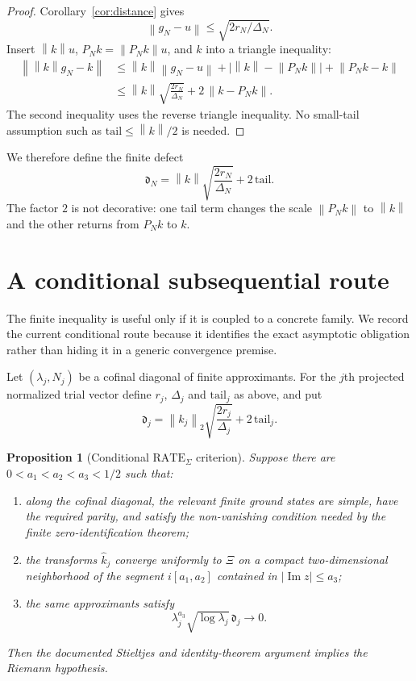 \documentclass[11pt]{article}
\newtheorem{proposition}[theorem]{Proposition}
\theoremstyle{definition}
\newcommand{\norm}[1]{\left\lVert #1\right\rVert}
\newcommand{\defect}{\mathfrak d}
\begin{document}
\begin{proof}
Corollary~\ref{cor:distance} gives
\[
 \norm{g_N-u}\leq\sqrt{2r_N/\Delta_N}.
\]
Insert $\norm{k}u$, $P_Nk=\norm{P_Nk}u$, and $k$ into a triangle inequality:
\begin{align*}
 \norm{\norm{k}g_N-k}
 &\leq \norm{k}\norm{g_N-u}
 +\bigl|\norm{k}-\norm{P_Nk}\bigr|
 +\norm{P_Nk-k}\\
 &\leq \norm{k}\sqrt{\frac{2r_N}{\Delta_N}}
 +2\,\norm{k-P_Nk}.
\end{align*}
The second inequality uses the reverse triangle inequality.  No small-tail
assumption such as $\mathrm{tail}\leq\norm{k}/2$ is needed.
\end{proof}

We therefore define the finite defect
\begin{equation}\label{eq:defect}
 \defect_N=\norm{k}\sqrt{\frac{2r_N}{\Delta_N}}
 +2\,\mathrm{tail}.
\end{equation}
The factor $2$ is not decorative: one tail term changes the scale
$\norm{P_Nk}$ to $\norm{k}$ and the other returns from $P_Nk$ to $k$.

\section{A conditional subsequential route}

The finite inequality is useful only if it is coupled to a concrete family.
We record the current conditional route because it identifies the exact
asymptotic obligation rather than hiding it in a generic convergence premise.

Let $(\lambda_j,N_j)$ be a cofinal diagonal of finite approximants.  For the
$j$th projected normalized trial vector define $r_j$, $\Delta_j$ and
$\mathrm{tail}_j$ as above, and put
\[
 \defect_j=\norm{k_j}_2\sqrt{\frac{2r_j}{\Delta_j}}
 +2\,\mathrm{tail}_j.
\]

\begin{proposition}[Conditional $\mathrm{RATE}_{\Sigma}$ criterion]
Suppose there are $0<a_1<a_2<a_3<1/2$ such that:
\begin{enumerate}[label=(P\arabic*)]
  \item along the cofinal diagonal, the relevant finite ground states are
  simple, have the required parity, and satisfy the non-vanishing condition
  needed by the finite zero-identification theorem;
  \item the transforms $\widehat{k}_j$ converge uniformly to $\Xi$ on a compact
  two-dimensional neighborhood of the segment $i[a_1,a_2]$ contained in
  $|\operatorname{Im}z|\leq a_3$;
  \item the same approximants satisfy
  \[
   \lambda_j^{a_3}\sqrt{\log\lambda_j}\,\defect_j\longrightarrow0.
  \]
\end{enumerate}
Then the documented Stieltjes and identity-theorem argument implies the
Riemann hypothesis.
\end{proposition}
\end{document}
